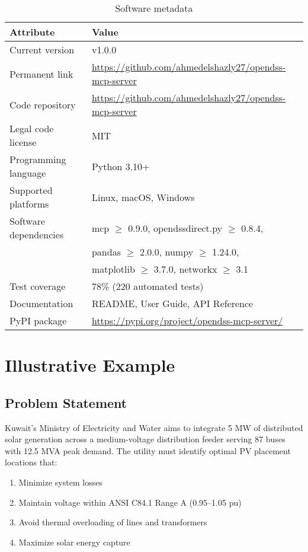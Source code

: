 \documentclass[review]{elsarticle}
\begin{document}
\begin{table}[ht]
\centering
\caption{Software metadata}
\label{tab:metadata}
\begin{tabular}{@{}ll@{}}
\toprule
\textbf{Attribute} & \textbf{Value} \\
\midrule
Current version & v1.0.0 \\
Permanent link & \url{https://github.com/ahmedelshazly27/opendss-mcp-server} \\
Code repository & \url{https://github.com/ahmedelshazly27/opendss-mcp-server} \\
Legal code license & MIT \\
Programming language & Python 3.10+ \\
Supported platforms & Linux, macOS, Windows \\
Software dependencies & mcp $\geq$ 0.9.0, opendssdirect.py $\geq$ 0.8.4, \\
                      & pandas $\geq$ 2.0.0, numpy $\geq$ 1.24.0, \\
                      & matplotlib $\geq$ 3.7.0, networkx $\geq$ 3.1 \\
Test coverage & 78\% (220 automated tests) \\
Documentation & README, User Guide, API Reference \\
PyPI package & \url{https://pypi.org/project/opendss-mcp-server/} \\
\bottomrule
\end{tabular}
\end{table}

\section{Illustrative Example}
\label{sec:example}

\subsection{Problem Statement}

Kuwait's Ministry of Electricity and Water aims to integrate 5 MW of distributed solar generation across a medium-voltage distribution feeder serving 87 buses with 12.5 MVA peak demand. The utility must identify optimal PV placement locations that:

\begin{enumerate}
    \item Minimize system losses
    \item Maintain voltage within ANSI C84.1 Range A (0.95--1.05 pu) \cite{ansic84}
    \item Avoid thermal overloading of lines and transformers
    \item Maximize solar energy capture
\end{enumerate}
\end{document}
